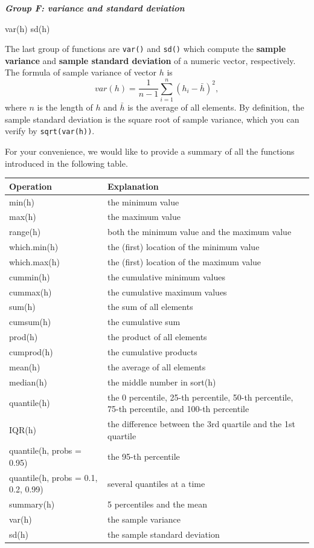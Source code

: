 \documentclass[
]{book}
\newenvironment{Shaded}{\begin{snugshade}}{\end{snugshade}}
\newcommand{\FunctionTok}[1]{\textcolor[rgb]{0.00,0.00,0.00}{#1}}
\newcommand{\NormalTok}[1]{#1}
\begin{document}
\textbf{\emph{Group F: variance and standard deviation}}

\begin{Shaded}
\begin{Highlighting}[]
\FunctionTok{var}\NormalTok{(h)}
\FunctionTok{sd}\NormalTok{(h)}
\end{Highlighting}
\end{Shaded}

The last group of functions are \texttt{var()} and \texttt{sd()} which compute the \textbf{sample variance} and \textbf{sample standard deviation} of a numeric vector, respectively. The formula of sample variance of vector \(h\) is \[var(h) = \frac{1}{n-1}\sum_{i=1}^n (h_i-\bar h)^2,\] where \(n\) is the length of \(h\) and \(\bar h\) is the average of all elements. By definition, the sample standard deviation is the square root of sample variance, which you can verify by \texttt{sqrt(var(h))}.

For your convenience, we would like to provide a summary of all the functions introduced in the following table.

\begin{tabular}{l|l}
\hline
Operation & Explanation\\
\hline
min(h) & the minimum value\\
\hline
max(h) & the maximum value\\
\hline
range(h) & both the minimum value and the maximum value\\
\hline
which.min(h) & the (first) location of the minimum value\\
\hline
which.max(h) & the (first) location of the maximum value\\
\hline
cummin(h) & the cumulative minimum values\\
\hline
cummax(h) & the cumulative maximum values\\
\hline
sum(h) & the sum of all elements\\
\hline
cumsum(h) & the cumulative sum\\
\hline
prod(h) & the product of all elements\\
\hline
cumprod(h) & the cumulative products\\
\hline
mean(h) & the average of all elements\\
\hline
median(h) & the middle number in sort(h)\\
\hline
quantile(h) & the 0 percentile, 25-th percentile, 50-th percentile, 75-th percentile, and 100-th percentile\\
\hline
IQR(h) & the difference between the 3rd quartile and the 1st quartile\\
\hline
quantile(h, probs = 0.95) & the 95-th percentile\\
\hline
quantile(h, probs = 0.1, 0.2, 0.99) & several quantiles at a time\\
\hline
summary(h) & 5 percentiles and the mean\\
\hline
var(h) & the sample variance\\
\hline
sd(h) & the sample standard deviation\\
\hline
\end{tabular}
\end{document}
